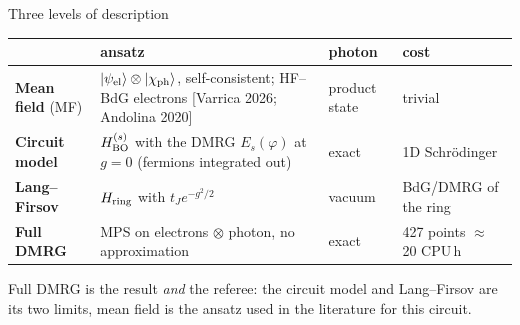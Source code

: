 \documentclass[aspectratio=169,9pt]{beamer}
\newcommand{\Hring}{H_{\rm ring}}
\renewcommand{\cite}[1]{{\scriptsize\textcolor{ink!60}{[#1]}}}
\begin{document}
\begin{frame}{Three levels of description}
  \centering
  \small
  \renewcommand{\arraystretch}{1.25}
  \begin{tabular}{@{}>{\raggedright}m{}>{\raggedright}m{}>{\raggedright}m{}m{}@{}}
    \toprule
    & ansatz & photon & cost \\ \midrule
    \textbf{Mean field} (MF) & $|\psi_{\rm el}\rangle\otimes|\chi_{\rm ph}\rangle$, self-consistent; HF--BdG electrons
      \cite{Varrica 2026; Andolina 2020} & product state & trivial \\
    \textbf{Circuit model} & $H^{(s)}_{\rm BO}$ with the DMRG $E_s(\varphi)$ at $g=0$ (fermions integrated out) &
      \alert{exact} & 1D Schr\"odinger \\
    \textbf{Lang--Firsov} & $\Hring$ with $t_Je^{-g^2/2}$ & vacuum & BdG/DMRG of the ring \\
    \textbf{Full DMRG} & MPS on electrons $\otimes$ photon, no approximation & \alert{exact} & 427 points $\approx$ 20 CPU\,h \\ \bottomrule
  \end{tabular}
  \vspace{3mm}
  \begin{keybox}
    \small Full DMRG is the result \emph{and} the referee: the circuit model and Lang--Firsov are its two limits,
    mean field is the ansatz used in the literature for this circuit.
  \end{keybox}
\end{frame}
\end{document}
